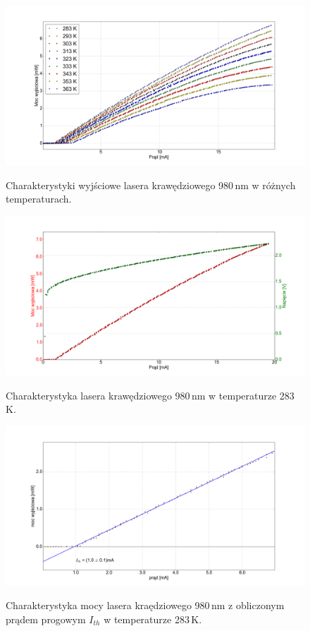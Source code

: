 \documentclass[a4paper, portrait,12pt]{report}
\begin{document}
\newpage


\begin{figure}
\center
  \includegraphics[scale=0.30]{plot980/plot_all.png}
  \label{rys1}
  \caption{Charakterystyki wyjściowe lasera krawędziowego 980\,nm w różnych temperaturach. } 
\end{figure}


\newpage
\begin{figure}
\center
  \includegraphics[scale=0.30]{plot980/temp_10_IVL.png}
  \label{rys1}
  \caption{Charakterystyka lasera krawędziowego 980\,nm w temperaturze 283\,K.} 
\end{figure}

\begin{figure}
\center
  \includegraphics[scale=0.30]{plot980/temp_10_fit.png}
  \label{rys1}
  \caption{Charakterystyka mocy lasera kraędziowego 980\,nm z obliczonym prądem progowym $I_{th}$  w temperaturze 283\,K.} 
\end{figure}
\end{document}

